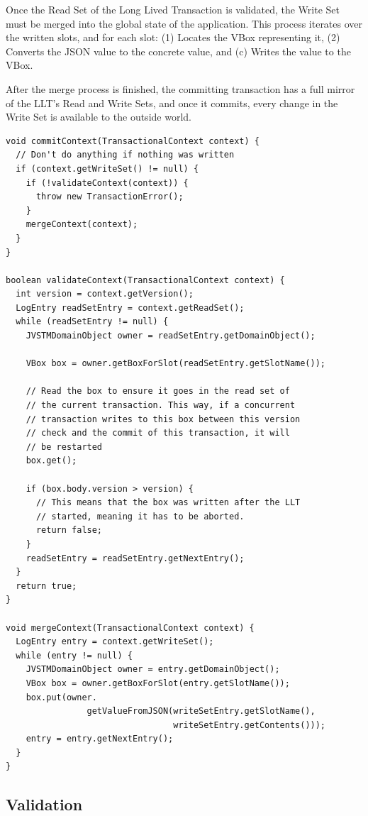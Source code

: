 \documentclass{llncs}
\begin{document}
Once the Read Set of the Long Lived Transaction is validated, the
Write Set must be merged into the global state of the
application. This process iterates over the written slots, and for
each slot: (1) Locates the VBox representing it, (2) Converts the JSON
value to the concrete value, and (c) Writes the value to the VBox.

After the merge process is finished, the committing transaction has a
full mirror of the LLT's Read and Write Sets, and once it commits,
every change in the Write Set is available to the outside world.

\begin{lstlisting}[caption={Implementation of the Long Lived
    Transaction commit operation}, label={list:lltCommit}, float]
void commitContext(TransactionalContext context) {
  // Don't do anything if nothing was written
  if (context.getWriteSet() != null) {
    if (!validateContext(context)) {
      throw new TransactionError();
    }
    mergeContext(context);
  }
}

boolean validateContext(TransactionalContext context) {
  int version = context.getVersion();
  LogEntry readSetEntry = context.getReadSet();
  while (readSetEntry != null) {
    JVSTMDomainObject owner = readSetEntry.getDomainObject();

    VBox box = owner.getBoxForSlot(readSetEntry.getSlotName());

    // Read the box to ensure it goes in the read set of 
    // the current transaction. This way, if a concurrent 
    // transaction writes to this box between this version
    // check and the commit of this transaction, it will
    // be restarted
    box.get();

    if (box.body.version > version) {
      // This means that the box was written after the LLT
      // started, meaning it has to be aborted.
      return false;
    }
    readSetEntry = readSetEntry.getNextEntry();
  }
  return true;
}

void mergeContext(TransactionalContext context) {
  LogEntry entry = context.getWriteSet();
  while (entry != null) {
    JVSTMDomainObject owner = entry.getDomainObject();
    VBox box = owner.getBoxForSlot(entry.getSlotName());
    box.put(owner.
                getValueFromJSON(writeSetEntry.getSlotName(), 
                                 writeSetEntry.getContents()));
    entry = entry.getNextEntry();
  }
}
\end{lstlisting}

\subsection{Validation}
\label{sec:validation}
\end{document}

